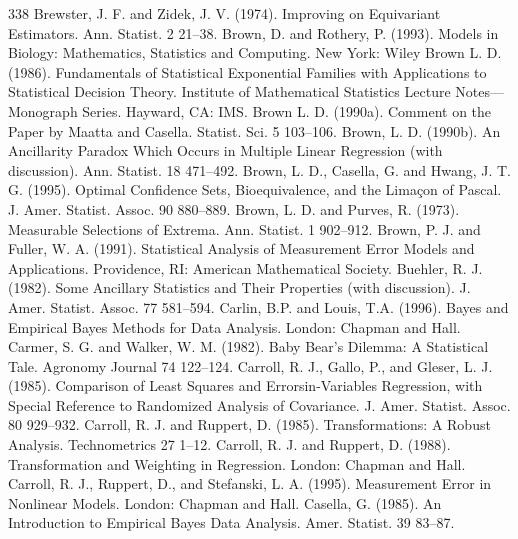 \begin{thebibliography}{338}
\label{bib:source48} Brewster, J. F. and Zidek, J. V. (1974). Improving on Equivariant Estimators. Ann. Statist. 2 21–38.
\label{bib:source49} Brown, D. and Rothery, P. (1993). Models in Biology: Mathematics, Statistics and Computing. New York: Wiley
\label{bib:source50} Brown L. D. (1986). Fundamentals of Statistical Exponential Families with Applications to Statistical Decision Theory. Institute of Mathematical Statistics Lecture Notes—Monograph Series. Hayward, CA: IMS.
\label{bib:source51} Brown L. D. (1990a). Comment on the Paper by Maatta and Casella. Statist. Sci. 5 103–106.
\label{bib:source52} Brown, L. D. (1990b). An Ancillarity Paradox Which Occurs in Multiple Linear Regression (with discussion). Ann. Statist. 18 471–492.
\label{bib:source53} Brown, L. D., Casella, G. and Hwang, J. T. G. (1995). Optimal Confidence Sets, Bioequivalence, and the Limaçon of Pascal. J. Amer. Statist. Assoc. 90 880–889.
\label{bib:source54} Brown, L. D. and Purves, R. (1973). Measurable Selections of Extrema. Ann. Statist. 1 902–912.
\label{bib:source55} Brown, P. J. and Fuller, W. A. (1991). Statistical Analysis of Measurement Error Models and Applications. Providence, RI: American Mathematical Society.
\label{bib:source56} Buehler, R. J. (1982). Some Ancillary Statistics and Their Properties (with discussion). J. Amer. Statist. Assoc. 77 581–594.
\label{bib:source57} Carlin, B.P. and Louis, T.A. (1996). Bayes and Empirical Bayes Methods for Data Analysis. London: Chapman and Hall.
\label{bib:source58} Carmer, S. G. and Walker, W. M. (1982). Baby Bear’s Dilemma: A Statistical Tale. Agronomy Journal 74 122–124.
\label{bib:source59} Carroll, R. J., Gallo, P., and Gleser, L. J. (1985). Comparison of Least Squares and Errorsin-Variables Regression, with Special Reference to Randomized Analysis of Covariance. J. Amer. Statist. Assoc. 80 929–932.
\label{bib:source60} Carroll, R. J. and Ruppert, D. (1985). Transformations: A Robust Analysis. Technometrics 27 1–12.
\label{bib:source61} Carroll, R. J. and Ruppert, D. (1988). Transformation and Weighting in Regression. London: Chapman and Hall.
\label{bib:source62} Carroll, R. J., Ruppert, D., and Stefanski, L. A. (1995). Measurement Error in Nonlinear Models. London: Chapman and Hall.
\label{bib:source63} Casella, G. (1985). An Introduction to Empirical Bayes Data Analysis. Amer. Statist. 39 83–87.

\end{thebibliography}
